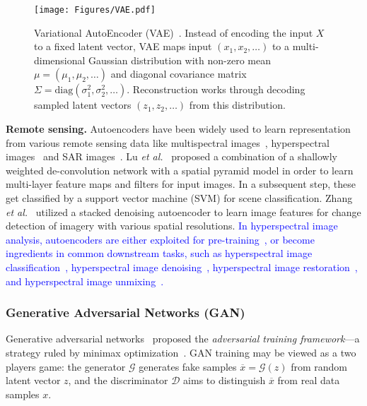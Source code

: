\documentclass[lettersize,journal]{IEEEtran}
\newcommand{\etal}{\textit{et al.}}
\begin{document}
\begin{figure}
\centering
\texttt{[image: Figures/VAE.pdf]}
\caption[vae]{Variational AutoEncoder (VAE)~\cite{kingma2013auto}. Instead of encoding the input $X$ to a fixed latent vector, VAE maps input $(x_1,x_2,\dots)$ to a multi-dimensional Gaussian distribution with non-zero mean $\mu=(\mu_1,\mu_2,\dots)$ and diagonal covariance matrix $\Sigma=\text{diag}(\sigma_1^2,\sigma_2^2,\dots)$. Reconstruction works through decoding sampled latent vectors $(z_1,z_2,\dots)$ from this distribution.}
\label{fig:vae}
\end{figure}


\textbf{Remote sensing.} Autoencoders have been widely used to learn representation from various remote sensing data like multispectral images~\cite{lu2017remote,zhang2016change,sharma2021self,madhuanand2021self,peng2020urban,nguyen2021self,tomenotti2020heterogeneous,palsson2022blind}, hyperspectral images~\cite{kemker2017self,mou2017unsupervised,imamura2019self,hong2021endmember,yao2020cross,chen2021hyperspectral,li2021self,ozkan2018endnet} and SAR images~\cite{hughes2018mining,molini2021speckle2void,yuan2019blind,pu2022sae}.
Lu \etal~\cite{lu2017remote} proposed a combination of a shallowly weighted de-convolution network
with a spatial pyramid model in order to learn multi-layer feature maps and filters for input images.
In a subsequent step, these get classified by a support vector machine (SVM) for scene classification.
Zhang \etal~\cite{zhang2016change} utilized a stacked denoising autoencoder to learn image features for
change detection of imagery with various spatial resolutions. 
\textcolor{blue}{In hyperspectral image analysis, autoencoders are either exploited for pre-training~\cite{mou2017unsupervised}, or become ingredients in common downstream tasks, such as hyperspectral image classification~\cite{kemker2017self}, hyperspectral image denoising~\cite{9383811}, hyperspectral image restoration~\cite{imamura2019self, qian2021hyperspectral}, and hyperspectral image unmixing~\cite{hong2021endmember,palsson2022blind,ozkan2018endnet}. }


\subsubsection{Generative Adversarial Networks (GAN)}


Generative adversarial networks~\cite{goodfellow2014generative,radford2015unsupervised} proposed the \textit{adversarial training framework}---a strategy ruled by minimax optimization~\cite{bertsimas2013robust}. GAN training may be viewed as a two players game: the generator $\mathcal{G}$ generates fake samples $\overline{x}=\mathcal{G}(z)$ from random latent vector $z$, and the discriminator $\mathcal{D}$ aims to distinguish $\overline{x}$ from real data samples $x$. 
\end{document}
